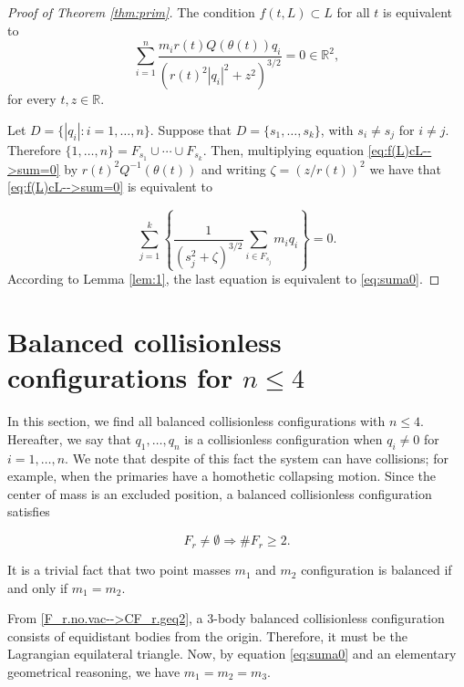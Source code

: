 \documentclass[smallcondensed]{svjour3}
\newcommand{\rr}{\mathbb{R}}
\begin{document}
\begin{proof}[Proof of Theorem \ref{thm:prim}]
The condition $f(t,L)\subset L$ for all $t$ is equivalent to
\begin{equation}\label{eq:f(L)cL-->sum=0}
 \sum_{i=1}^n\frac{m_ir(t)Q(\theta (t))q_i}{\left(r(t)^2|q_i|^2+z^2\right)^{3/2}}=0\in\rr^2,
\end{equation}
for every $t,z\in \rr$.

Let $D=\{|q_i|: i=1,\ldots,n\}$.  Suppose that $D=\{s_1,\ldots,s_k\}$, with $s_i\neq s_j$ for $i\neq j$.  Therefore $\{1,\ldots,n\}=F_{s_1}\cup \cdots\cup F_{s_k}$. Then, multiplying equation \eqref{eq:f(L)cL-->sum=0} by $r(t)^2Q^{-1}(\theta(t))$  and writing $\zeta=(z/r(t))^2$ we have that \eqref{eq:f(L)cL-->sum=0} is equivalent to


\[\sum_{j=1}^k\left\{\frac{1}{(s_j^{2}+\zeta)^{3/2}}\sum_{i\in F_{s_j}}m_iq_i\right\}=0.\]
According to Lemma \ref{lem:1}, the last equation is equivalent to \eqref{eq:suma0}.
\end{proof}


\section{Balanced collisionless configurations for $n\leq 4$}\label{sec:addmisibles}


In this section, we find all balanced collisionless configurations with $n\leq 4$. Hereafter,  we say that   $q_1,\ldots,q_n$ is a collisionless configuration  when $q_i\neq 0$ for $i=1,\ldots,n$. We note that despite of this fact the system can have collisions; for example,  when the primaries have a homothetic collapsing motion.  Since the center of mass is an excluded position, a balanced collisionless configuration satisfies

\begin{equation}\label{F_r.no.vac-->CF_r.geq2}
 F_r\neq \emptyset \Rightarrow \# F_r\geq 2.
\end{equation}



It is a trivial fact that  two point masses $m_1$ and $m_2$ configuration is balanced if and only if $m_1=m_2$.


From \eqref{F_r.no.vac-->CF_r.geq2}, a $3$-body balanced collisionless configuration consists of equidistant  bodies from the origin. Therefore, it must  be the Lagrangian equilateral triangle. Now, by equation \eqref{eq:suma0} and an elementary geometrical reasoning,   we have  $m_1=m_2=m_3$.
\end{document}
